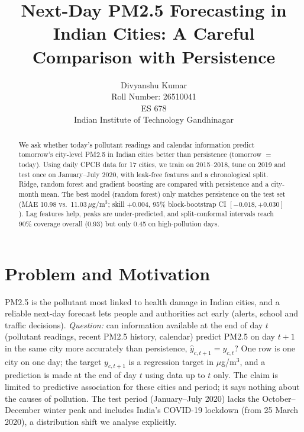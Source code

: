 \documentclass{article}
\title{Next-Day PM2.5 Forecasting in Indian Cities: A Careful Comparison with Persistence}
\author{%
  Divyanshu Kumar \\
  Roll Number: 26510041 \\
  ES 678 \\
  Indian Institute of Technology Gandhinagar
}
\begin{document}
\maketitle

\begin{abstract}
We ask whether today's pollutant readings and calendar information predict tomorrow's city-level PM2.5 in Indian cities better than persistence (tomorrow $=$ today). Using daily CPCB data for 17 cities, we train on 2015--2018, tune on 2019 and test once on January--July 2020, with leak-free features and a chronological split. Ridge, random forest and gradient boosting are compared with persistence and a city-month mean. The best model (random forest) only matches persistence on the test set (MAE 10.98 vs.\ 11.03\,$\mu$g/m$^3$; skill $+0.004$, 95\% block-bootstrap CI $[-0.018,+0.030]$). Lag features help, peaks are under-predicted, and split-conformal intervals reach 90\% coverage overall (0.93) but only 0.45 on high-pollution days.
\end{abstract}

\section{Problem and Motivation}
PM2.5 is the pollutant most linked to health damage in Indian cities, and a reliable next-day forecast lets people and authorities act early (alerts, school and traffic decisions). \emph{Question:} can information available at the end of day $t$ (pollutant readings, recent PM2.5 history, calendar) predict PM2.5 on day $t{+}1$ in the same city more accurately than persistence, $\hat y_{c,t+1}=y_{c,t}$? One row is one city on one day; the target $y_{c,t+1}$ is a regression target in $\mu$g/m$^3$, and a prediction is made at the end of day $t$ using data up to $t$ only. The claim is limited to predictive association for these cities and period; it says nothing about the causes of pollution. The test period (January--July 2020) lacks the October--December winter peak and includes India's COVID-19 lockdown (from 25 March 2020), a distribution shift we analyse explicitly.
\end{document}
